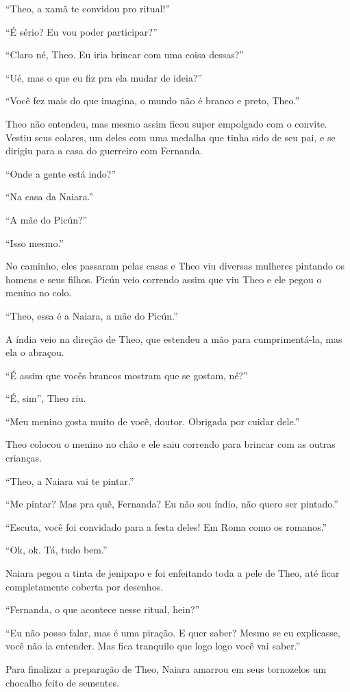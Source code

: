 ``Theo, a xamã te convidou pro ritual!''

``É sério? Eu vou poder participar?''

``Claro né, Theo. Eu iria brincar com uma coisa dessas?''

``Ué, mas o que eu fiz pra ela mudar de ideia?''

``Você fez mais do que imagina, o mundo não é branco e preto, Theo.''

Theo não entendeu, mas mesmo assim ficou super empolgado com o convite.
Vestiu seus colares, um deles com uma medalha que tinha sido de seu pai,
e se dirigiu para a casa do guerreiro com Fernanda.

``Onde a gente está indo?''

``Na casa da Naiara.''

``A mãe do Picún?''

``Isso mesmo.''

No caminho, eles passaram pelas casas e Theo viu diversas mulheres
pintando os homens e seus filhos. Picún veio correndo assim que viu Theo
e ele pegou o menino no colo.

``Theo, essa é a Naiara, a mãe do Picún.''

A índia veio na direção de Theo, que estendeu a mão para cumprimentá-la,
mas ela o abraçou.

``É assim que vocês brancos mostram que se gostam, né?''

``É, sim'', Theo riu.

``Meu menino gosta muito de você, doutor. Obrigada por cuidar dele.''

Theo colocou o menino no chão e ele saiu correndo para brincar com as
outras crianças.

``Theo, a Naiara vai te pintar.''

``Me pintar? Mas pra quê, Fernanda? Eu não sou índio, não quero ser
pintado.''

``Escuta, você foi convidado para a festa deles! Em Roma como os
romanos.''

``Ok, ok. Tá, tudo bem.''

Naiara pegou a tinta de jenipapo e foi enfeitando toda a pele de Theo,
até ficar completamente coberta por desenhos.

``Fernanda, o que acontece nesse ritual, hein?''

``Eu não posso falar, mas é uma piração. E quer saber? Mesmo se eu
explicasse, você não ia entender. Mas fica tranquilo que logo logo você
vai saber.''

Para finalizar a preparação de Theo, Naiara amarrou em seus tornozelos
um chocalho feito de sementes.

